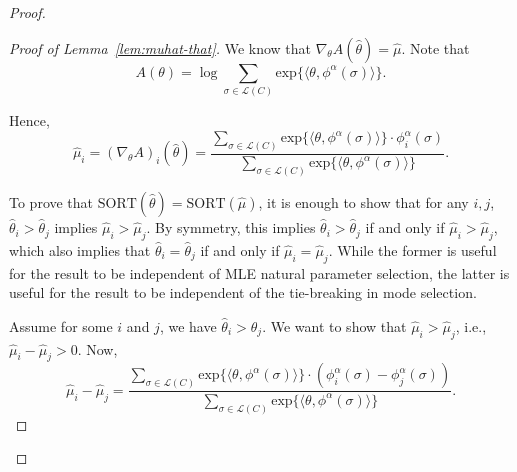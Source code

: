 \documentclass[10pt,letterpaper]{article}
\newcommand{\grad}{\nabla}
\newcommand{\calL}{{\mathcal{L}}}
\newcommand{\rank}{{\calL(C)}}
\newcommand{\sort}{\text{SORT}}
\newcommand{\phia}{\phi^{\alpha}}
\newcommand{\muhat}{\hat{\mu}}
\newcommand{\that}{\hat{\theta}}
\begin{document}
\begin{proof}
\begin{proof}[Proof of Lemma~\ref{lem:muhat-that}]
We know that $\grad_{\theta} A(\that) = \muhat$. Note that 
$$
A(\theta) = \log \sum_{\sigma \in \rank} \text{exp}\lbrace \langle \theta, \phia(\sigma) \rangle \rbrace.
$$

Hence, 
$$
\muhat_i = (\grad_{\theta} A)_i(\that) = \frac{\sum_{\sigma \in \rank} \text{exp}\lbrace \langle \theta, \phia(\sigma) \rangle \rbrace \cdot \phia_i(\sigma)}{\sum_{\sigma \in \rank} \text{exp}\lbrace \langle \theta, \phia(\sigma) \rangle \rbrace}.
$$

To prove that $\sort(\that) = \sort(\muhat)$, it is enough to show that for any $i,j$, $\that_i > \that_j$ implies $\muhat_i > \muhat_j$. By symmetry, this implies $\that_i > \that_j$ if and only if $\muhat_i > \muhat_j$, which also implies that $\that_i = \that_j$ if and only if $\muhat_i = \muhat_j$. While the former is useful for the result to be independent of MLE natural parameter selection, the latter is useful for the result to be independent of the tie-breaking in mode selection. 

Assume for some $i$ and $j$, we have $\that_i > \that_j$. We want to show that $\muhat_i > \muhat_j$, i.e., $\muhat_i - \muhat_j > 0$. Now, 
\begin{equation}
\muhat_i-\muhat_j = \frac{\sum_{\sigma \in \rank} \text{exp}\lbrace \langle \theta, \phia(\sigma) \rangle \rbrace \cdot (\phia_i(\sigma)-\phia_j(\sigma))}{\sum_{\sigma \in \rank} \text{exp}\lbrace \langle \theta, \phia(\sigma) \rangle \rbrace}.
\label{eqn:diff}
\end{equation}


\end{proof}
\end{proof}
\end{document}
